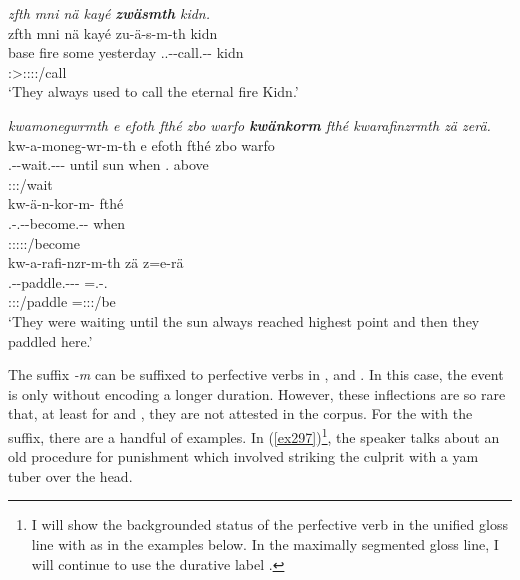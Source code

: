 \begin{exe}
	\ex \emph{zfth mni nä kayé \textbf{zwäsmth} kidn.}\\
	\glll zfth mni nä kayé zu-ä-s-m-th kidn\\
	base fire some yesterday \Tsg.\F.\Betaone-\Ndu-call.\Rs-\Dur-\Stnsg{} kidn\\
	{} {} {} {} \footnotesize{\Stpl:\Sbj>\Tsg:\Obj:\Pst:\Iter:\Dur/call} {}\\
	\trans `They always used to call the eternal fire Kidn.' 
	\label{ex295}
\end{exe}
\begin{exe}
	\ex \emph{kwamonegwrmth e efoth fthé zbo warfo \textbf{kwänkorm} fthé kwarafinzrmth zä zerä.}\\
	\glll kw-a-moneg-wr-m-th e efoth fthé zbo warfo\\
	\M.\Betaone-\Vc-wait.\Ext-\Ndu-\Dur-\Stnsg{} until sun when \Prox.\All{} above\\
	\footnotesize{\Stpl:\Sbj:\Pst:\Dur/wait} {} {} {} {} {}\\
	\sn
	\glll kw-ä-n-kor-m-\Zero{} fthé\\
	\M.\Betaone-\Vc.\Ndu-\Venit-become.\Rs-\Dur-\Stsg{} when\\
	\footnotesize{\Stsg:\Sbj:\Pst:\Iter:\Dur:\Venit/become} {}\\
	\sn
	\glll kw-a-rafi-nzr-m-th zä z=e-rä\\
	\M.\Betaone-\Vc-paddle.\Ext-\Ndu-\Dur-\Stnsg{} \Prox{} \Prox=\Stnsg.\Alph-\Cop.\Ndu{}\\
	\footnotesize{\Stpl:\Sbj:\Pst:\Dur/paddle} {} \footnotesize{\Prox=\Stpl:\Sbj:\Nonpast:\Ipfv/be}\\
	\trans `They were waiting until the sun always reached highest point and then they paddled here.' 
	\label{ex296}
\end{exe}

The  suffix \emph{-m} can be suffixed to perfective verbs in ,  and . In this case, the event is only  without encoding a longer duration. However, these inflections are so rare that, at least for  and , they are not attested in the corpus. For the   with the  suffix, there are a handful of examples. In (\ref{ex297})\footnote{I will show the backgrounded status of the perfective verb in the unified gloss line with \Bg{} as in the examples below. In the maximally segmented gloss line, I will continue to use the durative label \Dur{}.}, the speaker talks about an old procedure for punishment which involved striking the culprit with a yam tuber over the head.

